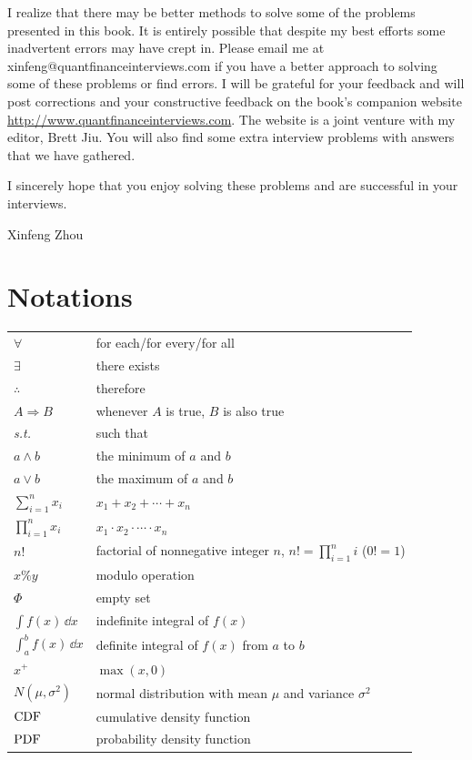 I realize that there may be better methods to solve some of the problems presented in
this book. It is entirely possible that despite my best efforts some inadvertent errors may
have crept in. Please email me at xinfeng@quantfinanceinterviews.com if you have a
better approach to solving some of these problems or find errors. I will be grateful for
your feedback and will post corrections and your constructive feedback on the book's
companion website \url{http://www.quantfinanceinterviews.com}. The website is a joint
venture with my editor, Brett Jiu. You will also find some extra interview problems
with answers that we have gathered.

I sincerely hope that you enjoy solving these problems and are successful in your
interviews.

\begin{flushright}
Xinfeng Zhou
\end{flushright}

\section*{Notations}

\begin{tabular}{@{}ll@{}}
  $\forall$ & for each/for every/for all \\
  $\exists$ & there exists \\
  $\therefore$ & therefore \\
  $A \Rightarrow B$ & whenever $A$ is true, $B$ is also true \\
  \textit{s.t.} & such that \\
  $a \wedge b$ & the minimum of $a$ and $b$ \\
  $a \vee b$ & the maximum of $a$ and $b$ \\
  $\displaystyle\sum_{i=1}^{n} x_i$ & $x_1+x_2+\cdots+x_n$ \\
  $\displaystyle\prod_{i=1}^{n} x_i$ & $x_1\cdot x_2\cdot\cdots\cdot x_n$ \\
  $n!$ & factorial of nonnegative integer $n$, $n!=\displaystyle\prod_{i=1}^{n}i$ ($0!=1$) \\
  $x\%y$ & modulo operation \\
  $\Phi$ & empty set \\
  $\displaystyle\int f(x)\,\dd x$ & indefinite integral of $f(x)$ \\
  $\displaystyle\int_a^b f(x)\,\dd x$ & definite integral of $f(x)$ from $a$ to $b$ \\
  $x^+$ & $\max(x,0)$ \\
  $N(\mu,\sigma^2)$ & normal distribution with mean $\mu$ and variance $\sigma^2$ \\
  $\mathrm{CDF}$ & cumulative density function \\
  $\mathrm{PDF}$ & probability density function
\end{tabular}
